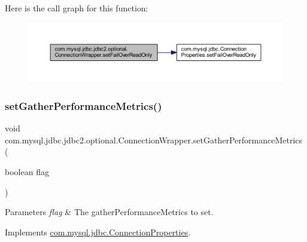 Here is the call graph for this function\+:
\nopagebreak
\begin{figure}[H]
\begin{center}
\leavevmode
\includegraphics[width=350pt]{classcom_1_1mysql_1_1jdbc_1_1jdbc2_1_1optional_1_1_connection_wrapper_a23b3e7be6b29af8786a6641fec4196aa_cgraph}
\end{center}
\end{figure}
\mbox{\label{classcom_1_1mysql_1_1jdbc_1_1jdbc2_1_1optional_1_1_connection_wrapper_a245c02868e2569c0144af26ede2258e9}} 
\subsubsection{\texorpdfstring{set\+Gather\+Performance\+Metrics()}{setGatherPerformanceMetrics()}}
{\footnotesize\ttfamily void com.\+mysql.\+jdbc.\+jdbc2.\+optional.\+Connection\+Wrapper.\+set\+Gather\+Performance\+Metrics (\begin{DoxyParamCaption}\item[{boolean}]{flag }\end{DoxyParamCaption})}


\begin{DoxyParams}{Parameters}
{\em flag} & The gather\+Performance\+Metrics to set. \\
\hline
\end{DoxyParams}


Implements \mbox{\hyperlink{interfacecom_1_1mysql_1_1jdbc_1_1_connection_properties_a8083ba3dcac8d6d8ec42c635f0f19be4}{com.\+mysql.\+jdbc.\+Connection\+Properties}}.

